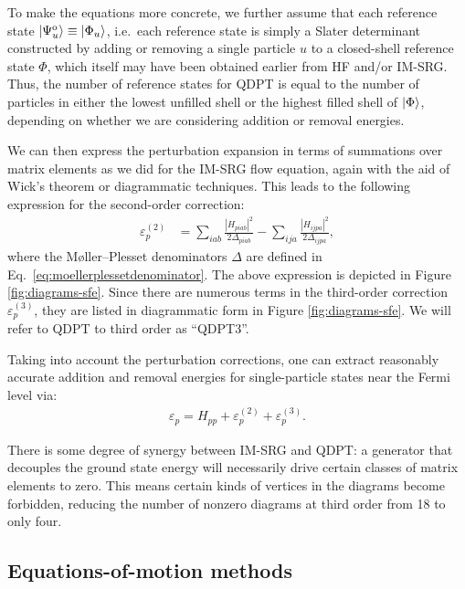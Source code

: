 To make the equations more concrete, we further assume that each reference state $| \Psi^{\mathrm{o}}_u \rangle \equiv | \Phi_u \rangle$, i.e.\ each reference state is simply a Slater determinant constructed by adding or removing a single particle $u$ to a closed-shell reference state $\Phi$, which itself may have been obtained earlier from HF and/or IM-SRG.  Thus, the number of reference states for QDPT is equal to the number of particles in either the lowest unfilled shell or the highest filled shell of $| \Phi \rangle$, depending on whether we are considering addition or removal energies.

We can then express the perturbation expansion in terms of summations over matrix elements as we did for the IM-SRG flow equation, again with the aid of Wick's theorem or diagrammatic techniques.  This leads to the following expression for the second-order correction:
\begin{align*}
  \varepsilon_p^{(2)}
  &=
    \sum_{i a b} \frac{|H_{p i a b}|^2}{2 \Delta_{p i a b}}
    - \sum_{i j a} \frac{|H_{i j p a}|^2}{2 \Delta_{i j p a}},
\end{align*}
where the M\o ller--Plesset denominators $\Delta$ are defined in Eq.\ \eqref{eq:moellerplessetdenominator}.  The above expression is depicted in Figure \ref{fig:diagrams-sfe}.  Since there are numerous terms in the third-order correction $\varepsilon_p^{(3)}$, they are listed in diagrammatic form in Figure \ref{fig:diagrams-sfe}.  We will refer to QDPT to third order as ``QDPT3''.

Taking into account the perturbation corrections, one can extract reasonably accurate addition and removal energies for single-particle states near the Fermi level via:
\begin{align*}
  \varepsilon_p = H_{p p} + \varepsilon_p^{(2)} + \varepsilon_p^{(3)}.
\end{align*}

There is some degree of synergy between IM-SRG and QDPT: a generator that decouples the ground state energy will necessarily drive certain classes of matrix elements to zero.  This means certain kinds of vertices in the diagrams become forbidden, reducing the number of nonzero diagrams at third order from 18 to only four.

\subsection{Equations-of-motion methods}

